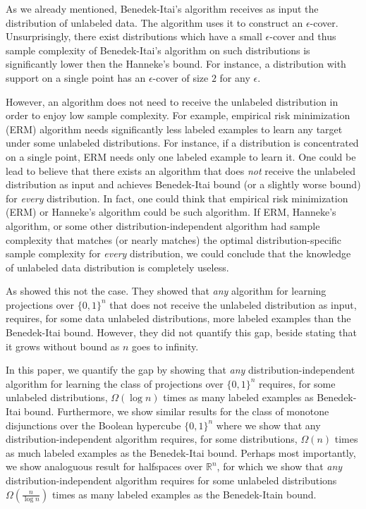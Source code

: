 \documentclass[10pt]{article}
\newcommand{\R}{\mathbb{R}}
\begin{document}
As we already mentioned, Benedek-Itai's algorithm receives as input the
distribution of unlabeled data. The algorithm uses it to construct an
$\epsilon$-cover. Unsurprisingly, there exist distributions which have a small
$\epsilon$-cover and thus sample complexity of Benedek-Itai's algorithm on such
distributions is significantly lower then the Hanneke's bound. For instance, a
distribution with support on a single point has an $\epsilon$-cover of size $2$
for any $\epsilon$.

However, an algorithm does not need to receive the unlabeled distribution in
order to enjoy low sample complexity. For example, empirical risk minimization
(ERM) algorithm needs significantly less labeled examples to learn any target
under some unlabeled distributions. For instance, if a distribution is
concentrated on a single point, ERM needs only one labeled example to learn it.
One could be lead to believe that there exists an algorithm that does \emph{not}
receive the unlabeled distribution as input and achieves Benedek-Itai bound (or
a slightly worse bound) for \emph{every} distribution. In fact, one could think
that empirical risk minimization (ERM) or Hanneke's algorithm could be such
algorithm. If ERM, Hanneke's algorithm, or some other distribution-independent
algorithm had sample complexity that matches (or nearly matches) the optimal
distribution-specific sample complexity for \emph{every} distribution, we could
conclude that the knowledge of unlabeled data distribution is completely
useless.

As \cite{Darnstadt-Simon-Szorenyi-2013} showed this not the case. They showed
that \emph{any} algorithm for learning projections over $\{0,1\}^n$ that does
not receive the unlabeled distribution as input, requires, for some data
unlabeled distributions, more labeled examples than the Benedek-Itai bound.
However, they did not quantify this gap, beside stating that it grows without
bound as $n$ goes to infinity.

In this paper, we quantify the gap by showing that \emph{any}
distribution-independent algorithm for learning the class of projections over
$\{0,1\}^n$ requires, for some unlabeled distributions, $\Omega(\log n)$ times
as many labeled examples as Benedek-Itai bound. Furthermore, we show similar
results for the class of monotone disjunctions over the Boolean hypercube
$\{0,1\}^n$ where we show that any distribution-independent algorithm requires,
for some distributions, $\Omega(n)$ times as much labeled examples as the
Benedek-Itai bound. Perhaps most importantly, we show analoguous result for
halfspaces over $\R^n$, for which we show that \emph{any}
distribution-independent algorithm requires for some unlabeled distributions
$\Omega(\frac{n}{\log n})$ times as many labeled examples as the Benedek-Itain
bound.
\end{document}
